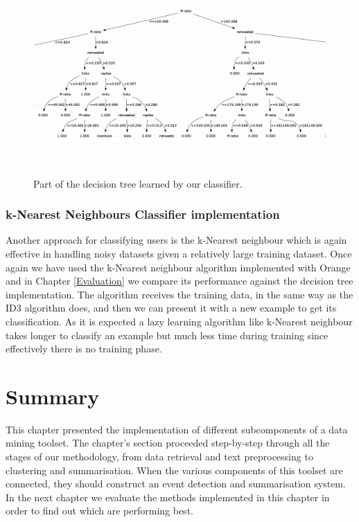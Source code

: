 \begin{figure}[htbp]
  \begin{center}
    \includegraphics[height=3in, width=6in]{tree}
    \caption{Part of the decision tree learned by our classifier.}
    \label{Tree}
  \end{center}
\end{figure} 

\subsubsection{k-Nearest Neighbours Classifier implementation}
Another approach for classifying users is the k-Nearest neighbour which is again effective in handling noisy datasets given a relatively large training dataset. Once again we have used the k-Nearest neighbour algorithm implemented with Orange and in Chapter \ref{Evaluation} we compare its performance against the decision tree implementation. The algorithm receives the training data, in the same way as the ID3 algorithm does, and then we can present it with a new example to get its classification. As it is expected a lazy learning algorithm like k-Nearest neighbour takes longer to classify an example but much less time during training since effectively there is no training phase.   

\section{Summary}
This chapter presented the implementation of different subcomponents of a data mining toolset. The chapter's section proceeded step-by-step through all the stages of our methodology, from data retrieval and text preprocessing to clustering and summarisation. When the various components of this toolset are connected, they should construct an event detection and summarisation system. In the next chapter we evaluate the methods implemented in this chapter in order to find out which are performing best.


